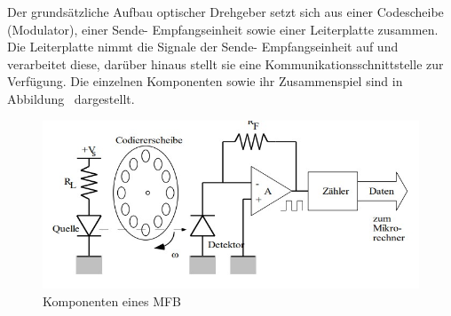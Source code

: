 Der grundsätzliche Aufbau optischer Drehgeber setzt sich aus einer Codescheibe (Modulator), einer Sende- Empfangseinheit sowie einer Leiterplatte zusammen. Die Leiterplatte nimmt die Signale der Sende- Empfangseinheit auf und verarbeitet diese, darüber hinaus stellt sie eine Kommunikationsschnittstelle zur Verfügung. Die einzelnen Komponenten sowie ihr 			Zusammenspiel sind in Abbildung \dq {}\dq~dargestellt.\newline
  	\begin{figure}[h]
        \centering
        \includegraphics[width=1\textwidth]{img/Schematischer_aufbau_encoder.jpg} 
        \caption[Komponenten eines MFB]{Komponenten eines \ac{MFB} \cite{Dr.MartinDo.11.11.2020}}
        \label{fig:Schematischer_aufbau_encoder.jpg}
    \end{figure}
    
